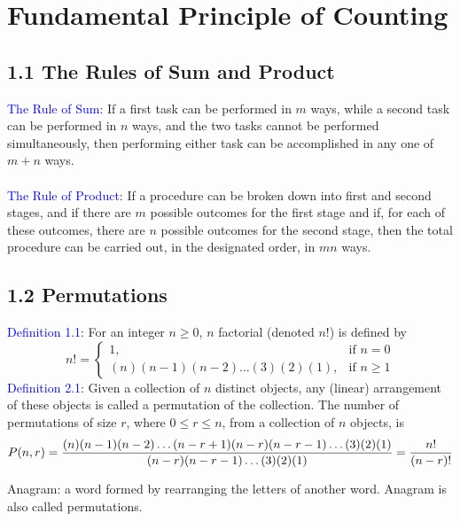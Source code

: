 \documentclass[letter]{book}
\begin{document}
\chapter{Fundamental Principle of Counting}

\section*{1.1 The Rules of Sum and Product}
\textcolor{blue}{The Rule of Sum}: If a first task can be performed in $m$ ways, while a second task can be performed in $n$ ways, and the two tasks cannot be performed simultaneously, then performing either task can be accomplished in any one of $m+n$ ways.\\
\\
\textcolor{blue}{The Rule of Product}: If a procedure can be broken down into first and second stages, and if there are $m$ possible outcomes for the first stage and if, for each of these outcomes, there are $n$ possible outcomes for the second stage, then the total procedure can be carried out, in the designated order, in $mn$ ways.

\section*{1.2 Permutations}
\textcolor{blue}{Definition 1.1}: For an integer $n\geq 0$, $n$ factorial (denoted $n!$) is defined by
$$
n! =
\begin{cases}
1,  & \text{if $n=0$} \\
(n)(n-1)(n-2)\dots(3)(2)(1), & \text{if $n\geqslant1$}
\end{cases}
$$
\textcolor{blue}{Definition 2.1}: Given a collection of $n$ distinct objects, any (linear) arrangement of these objects is called a permutation of the collection. The number of permutations of size $r$, where $0\leq r\leq n$, from a collection of $n$ objects, is
$$
P(n,r)={(n)(n-1)(n-2)\dots(n-r+1)(n-r)(n-r-1)\dots(3)(2)(1)\over(n-r)(n-r-1)\dots(3)(2)(1)}={n!\over(n-r)!}
$$
\begin{displayquote}
Anagram: a word formed by rearranging the letters of another word. Anagram is also called permutations.
\end{displayquote}
\end{document}
